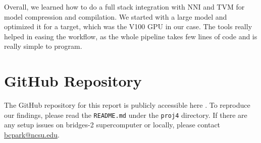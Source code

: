 \documentclass{article}
\begin{document}
Overall, we learned how to do a full stack integration with NNI and TVM for model compression and compilation. We started with a large model and optimized it for a target, which was the V100 GPU in our case. The tools really helped in easing the workflow, as the whole pipeline takes few lines of code and is really simple to program.


\section{GitHub Repository}
The GitHub repository for this report is publicly accessible here \cite{proj4-repo}. To reproduce our findings, please read the \verb|README.md| under the \verb|proj4| directory. If there are any setup issues on bridges-2 supercomputer or locally, please contact \href{mailto:bcpark@ncsu.edu}{bcpark@ncsu.edu}.



\end{document}
